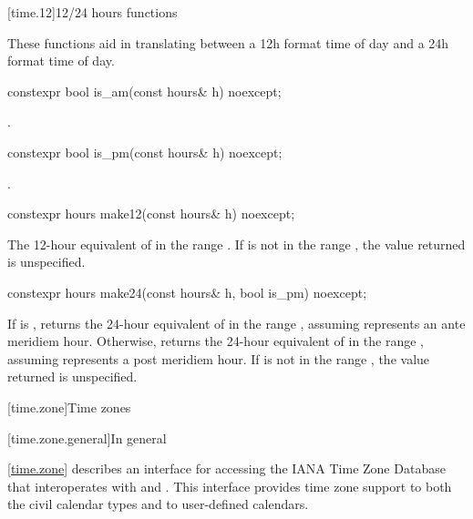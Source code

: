 [time.12]{12/24 hours functions}

\pnum
These functions aid in translating between a 12h format time of day
and a 24h format time of day.

%
\begin{itemdecl}
constexpr bool is_am(const hours& h) noexcept;
\end{itemdecl}

\begin{itemdescr}
\pnum
\returns
{}.
\end{itemdescr}

%
\begin{itemdecl}
constexpr bool is_pm(const hours& h) noexcept;
\end{itemdecl}

\begin{itemdescr}
\pnum
\returns
{}.
\end{itemdescr}

%
\begin{itemdecl}
constexpr hours make12(const hours& h) noexcept;
\end{itemdecl}

\begin{itemdescr}
\pnum
\returns
The 12-hour equivalent of  in the range .
If  is not in the range ,
the value returned is unspecified.
\end{itemdescr}

%
\begin{itemdecl}
constexpr hours make24(const hours& h, bool is_pm) noexcept;
\end{itemdecl}

\begin{itemdescr}
\pnum
\returns
If  is ,
returns the 24-hour equivalent of 
in the range ,
assuming  represents an ante meridiem hour.
Otherwise,
returns the 24-hour equivalent of 
in the range ,
assuming  represents a post meridiem hour.
If  is not in the range ,
the value returned is unspecified.
\end{itemdescr}

[time.zone]{Time zones}

[time.zone.general]{In general}

\pnum
\ref{time.zone} describes an interface for accessing
the IANA Time Zone Database
that interoperates with  and .
This interface provides time zone support to
both the civil calendar types
and to user-defined calendars.

